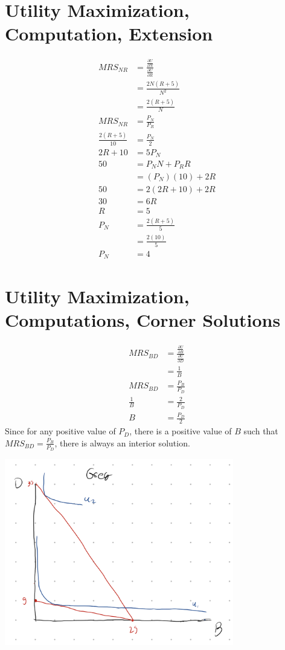 \documentclass[8pt]{extarticle}
\begin{document}
{\section*{Utility Maximization, Computation, Extension}
\begin{align*}
	MRS_{NR} &= \frac{\frac{\partial U}{\partial N}}{\frac{\partial U}{\partial R}} \\
	&= \frac{2N(R+5)}{N^2} \\
	&= \frac{2(R+5)}{N} \\
	MRS_{NR} &= \frac{P_N}{P_R} \\
	\frac{2(R+5)}{10} &= \frac{P_N}{2} \\
	2R + 10 &= 5P_{N} \\
	50 &= P_N N + P_R R \\
	&= (P_N)(10) + 2R \\
	50 &= 2(2R+10) + 2R \\
	30 &= 6R \\
	R &= 5 \\
	P_N &= \frac{2(R+5)}{5} \\
	&= \frac{2(10)}{5} \\
	P_N &= \boxed{4}
\end{align*}
\section*{Utility Maximization, Computations, Corner Solutions}
\begin{align*}
	MRS_{BD} &= \frac{\frac{\partial U}{\partial B}}{\frac{\partial U}{\partial D}} \\
	&= \frac{1}{B}\\
	MRS_{BD} &= \frac{P_B}{P_D} \\
	\frac{1}{B} &= \frac{2}{P_D} \\
	B &= \frac{P_D}{2}
\end{align*}
Since for any positive value of $P_D$, there is a positive value of $B$ such that $MRS_{BD} = \frac{P_B}{P_D}$, there is always an interior solution.
\begin{center}
	\includegraphics[width=10cm]{HW4Q3}
\end{center}
}
\end{document}
